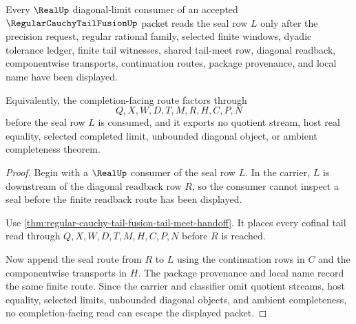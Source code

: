 \begin{theorem}
\label{thm:regular-cauchy-tail-fusion-real-limit-handoff}
Every $\RealUp$ diagonal-limit consumer of an accepted $\RegularCauchyTailFusionUp$ packet reads the seal row $L$ only after the precision request, regular rational family, selected finite windows, dyadic tolerance ledger, finite tail witnesses, shared tail-meet row, diagonal readback, componentwise transports, continuation routes, package provenance, and local name have been displayed.

Equivalently, the completion-facing route factors through
$$
Q,X,W,D,T,M,R,H,C,P,N
$$
before the seal row $L$ is consumed, and it exports no quotient stream, host real equality, selected completed limit, unbounded diagonal object, or ambient completeness theorem.
\end{theorem}
\begin{proof}
Begin with a $\RealUp$ consumer of the seal row $L$. In the carrier, $L$ is downstream of the diagonal readback row $R$, so the consumer cannot inspect a seal before the finite readback route has been displayed.

Use \autoref{thm:regular-cauchy-tail-fusion-tail-meet-handoff}. It places every cofinal tail read through $Q,X,W,D,T,M,H,C,P,N$ before $R$ is reached.

Now append the seal route from $R$ to $L$ using the continuation rows in $C$ and the componentwise transports in $H$. The package provenance and local name record the same finite route. Since the carrier and classifier omit quotient streams, host equality, selected limits, unbounded diagonal objects, and ambient completeness, no completion-facing read can escape the displayed packet.
\end{proof}

